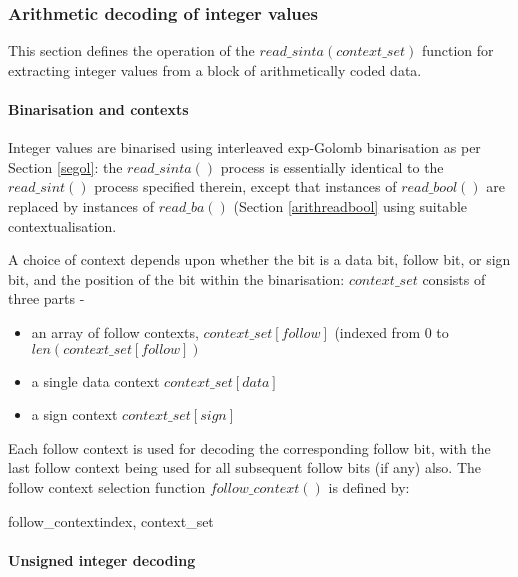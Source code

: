 \subsubsection{Arithmetic decoding of integer values}

This section defines the operation of the $read\_sinta(context\_set)$ function
 for extracting integer values from a block of arithmetically coded data.

\paragraph{Binarisation and contexts \\}

Integer values are binarised using interleaved exp-Golomb binarisation as per
Section \ref{segol}: the $read\_sinta()$ process is essentially identical to the 
$read\_sint()$ process specified therein, except that instances of $read\_bool()$ are replaced
by instances of $read\_ba()$ (Section \ref{arithreadbool} using suitable contextualisation. 

A choice of context depends upon whether the bit is a data bit, follow bit, or sign bit, and the 
position of the bit within the binarisation: $context\_set$ consists of three parts -
\begin{itemize}
\item an array of follow contexts, $context\_set[follow]$ (indexed from 0 to 
$len(context\_set[follow])$
\item a single data context $context\_set[data]$ 
\item a sign context $context\_set[sign]$
\end{itemize}

Each follow context is used for decoding the corresponding follow bit, with the
last follow context being used for all subsequent follow bits (if any) also. 
The follow context selection function $follow\_context()$ is defined by:

\begin{pseudo}{follow\_context}{index, context\_set}
\end{pseudo}

\paragraph{Unsigned integer decoding \\}

